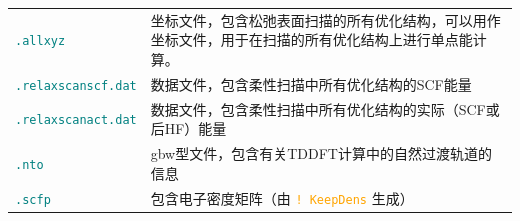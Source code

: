 \documentclass{ctexart}
\newcommand{\cmd}[1]{\textcolor{orange}{ \texttt{#1} }}
\newcommand{\file}[1]{\textcolor{teal}{ \texttt{#1} }}
\begin{document}
\begin{table}[H]
\begin{tabularx}{0.9\linewidth}{lX}
	 \file{.allxyz}           & 坐标文件，包含松弛表面扫描的所有优化结构，可以用作坐标文件，用于在扫描的所有优化结构上进行单点能计算。   \\                        
		 \file{.relaxscanscf.dat} & 数据文件，包含柔性扫描中所有优化结构的SCF能量    \\                                                                                     
		 \file{.relaxscanact.dat} & 数据文件，包含柔性扫描中所有优化结构的实际（SCF或后HF）能量  \\                                                                         
		 \file{.nto}              & gbw型文件，包含有关TDDFT计算中的自然过渡轨道的信息    \\                                                                                
		\file{.scfp}             & 包含电子密度矩阵（由\cmd{! KeepDens}生成）                   \\                                                                             
			\bottomrule
	\end{tabularx}
	\end{table}
	
	
\end{document}
